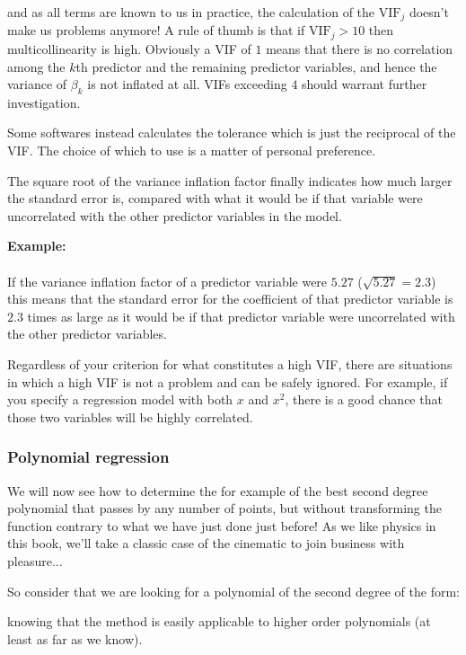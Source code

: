  	and as all terms are known to us in practice, the calculation of the $\text{VIF}_j$ doesn't make us problems anymore!
	A rule of thumb is that if $\text{VIF}_j>10$ then multicollinearity is high. Obviously a VIF of $1$ means that there is no correlation among the $k$th predictor and the remaining predictor variables, and hence the variance of $\beta_k$ is not inflated at all. VIFs exceeding $4$ should warrant further investigation.
	\begin{tcolorbox}[title=Remark,colframe=black,arc=10pt]
	Some softwares instead calculates the tolerance which is just the reciprocal of the VIF. The choice of which to use is a matter of personal preference.
	\end{tcolorbox}
	The square root of the variance inflation factor finally indicates how much larger the standard error is, compared with what it would be if that variable were uncorrelated with the other predictor variables in the model.
	\begin{tcolorbox}[colframe=black,colback=white,sharp corners]
	\textbf{{\Large {}}Example:}\\\\
	If the variance inflation factor of a predictor variable were $5.27$ ($\sqrt{5.27} = 2.3$) this means that the standard error for the coefficient of that predictor variable is $2.3$ times as large as it would be if that predictor variable were uncorrelated with the other predictor variables.
	\end{tcolorbox}
	Regardless of your criterion for what constitutes a high VIF, there are situations in which a high VIF is not a problem and can be safely ignored. For example, if you specify a regression model with both $x$ and $x^2$, there is a good chance that those two variables will be highly correlated. 
	
	\subsubsection{Polynomial regression}
	We will now see how to determine the for example of the best second degree polynomial that passes by any number of points, but without transforming the function contrary to what we have just done just before! As we like physics in this book, we'll take a classic case of the cinematic to join business with pleasure...
	
	So consider that we are looking for a polynomial of the second degree of the form:
	
	knowing that the method is easily applicable to higher order polynomials (at least as far as we know).
	
